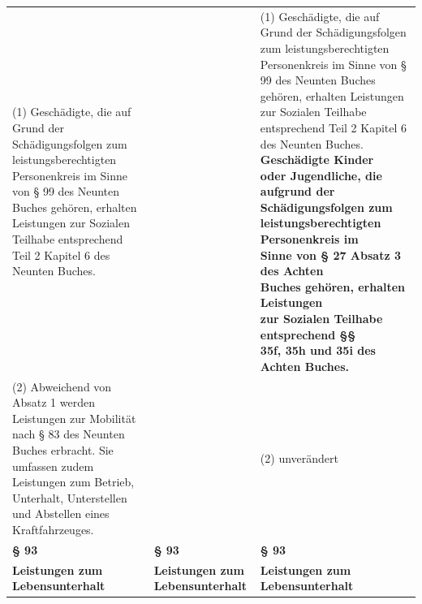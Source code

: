 \documentclass[10pt,a4paper,landscape]{article}
\begin{document}
\begin{longtable}{|L{8.2cm}|L{8.2cm}|L{8.2cm}|}
(1) Geschädigte, die auf Grund der  \newline Schädigungsfolgen zum  \newline leistungsberechtigten Personenkreis im  \newline Sinne von \S{} 99 des Neunten Buches  \newline gehören, erhalten Leistungen zur Sozialen  \newline Teilhabe entsprechend Teil 2 Kapitel 6 des  \newline Neunten Buches. &  & (1) Geschädigte, die auf Grund der  \newline Schädigungsfolgen zum  \newline leistungsberechtigten Personenkreis im  \newline Sinne von \S{} 99 des Neunten Buches  \newline gehören, erhalten Leistungen zur Sozialen  \newline Teilhabe entsprechend Teil 2 Kapitel 6 des  \newline Neunten Buches. \textbf{\textcolor{diffgreen}{Geschädigte Kinder  \newline oder Jugendliche, die aufgrund der  \newline Schädigungsfolgen zum  \newline leistungsberechtigten Personenkreis im  \newline Sinne von \S{} 27 Absatz 3 des Achten  \newline Buches gehören, erhalten Leistungen  \newline zur Sozialen Teilhabe entsprechend \S{}\S{}  \newline 35f, 35h und 35i des Achten Buches.}} \\
\hhline{|---|}
(2) Abweichend von Absatz 1 werden  \newline Leistungen zur Mobilität nach \S{} 83 des  \newline Neunten Buches erbracht. Sie umfassen  \newline zudem Leistungen zum Betrieb, Unterhalt,  \newline Unterstellen und Abstellen eines  \newline Kraftfahrzeuges. &  & (2) unverändert \\
\hhline{|---|}
\textbf{\S{} 93} & \textbf{\S{} 93} & \textbf{\S{} 93} \\
\hhline{|---|}
\textbf{Leistungen zum Lebensunterhalt} & \textbf{Leistungen zum Lebensunterhalt} & \textbf{Leistungen zum Lebensunterhalt} \\

\end{longtable}
\end{document}
